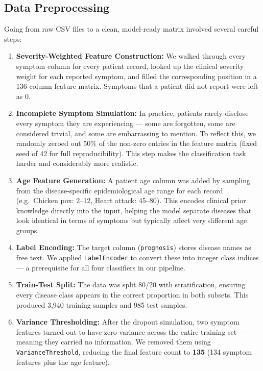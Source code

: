\documentclass[12pt,a4paper]{article}
\begin{document}
\subsection{Data Preprocessing}

Going from raw CSV files to a clean, model-ready matrix involved several careful steps:

\begin{enumerate}
    \item \textbf{Severity-Weighted Feature Construction:} We walked through every symptom column for every patient record, looked up the clinical severity weight for each reported symptom, and filled the corresponding position in a 136-column feature matrix. Symptoms that a patient did not report were left as 0.

    \item \textbf{Incomplete Symptom Simulation:} In practice, patients rarely disclose every symptom they are experiencing --- some are forgotten, some are considered trivial, and some are embarrassing to mention. To reflect this, we randomly zeroed out 50\% of the non-zero entries in the feature matrix (fixed seed of 42 for full reproducibility). This step makes the classification task harder and considerably more realistic.

    \item \textbf{Age Feature Generation:} A patient age column was added by sampling from the disease-specific epidemiological age range for each record (e.g.\ Chicken pox: 2--12, Heart attack: 45--80). This encodes clinical prior knowledge directly into the input, helping the model separate diseases that look identical in terms of symptoms but typically affect very different age groups.

    \item \textbf{Label Encoding:} The target column (\texttt{prognosis}) stores disease names as free text. We applied \texttt{LabelEncoder} to convert these into integer class indices --- a prerequisite for all four classifiers in our pipeline.

    \item \textbf{Train-Test Split:} The data was split 80/20 with stratification, ensuring every disease class appears in the correct proportion in both subsets. This produced 3,940 training samples and 985 test samples.

    \item \textbf{Variance Thresholding:} After the dropout simulation, two symptom features turned out to have zero variance across the entire training set --- meaning they carried no information. We removed them using \texttt{VarianceThreshold}, reducing the final feature count to \textbf{135} (134 symptom features plus the age feature).
\end{enumerate}
\end{document}
